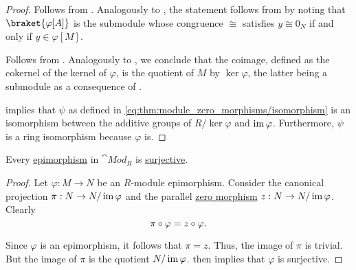 \begin{proof}
   Follows from .
   Analogously to , the statement follows from  by noting that \( \braket{ \varphi[A] } \) is the submodule whose congruence \( \cong \) satisfies \( y \cong 0_N \) if and only if \( y \in \varphi[M] \).

   Follows from .
   Analogously to , we conclude that the coimage, defined as the cokernel of the kernel of \( \varphi \), is the quotient of \( M \) by \( \ker \varphi \), the latter being a submodule as a consequence of .

    implies that \( \psi \) as defined in \eqref{eq:thm:module_zero_morphisms/isomorphism} is an isomorphism between the additive groups of \( R / \ker \varphi \) and \( \operatorname{im} \varphi \). Furthermore, \( \psi \) is a ring isomorphism because \( \varphi \) is.
\end{proof}

\begin{proposition}\label{thm:module_epimorphisms_are_surjective}
  Every \hyperref[def:morphism_invertibility/right_cancellative]{epimorphism} in \hyperref[def:group/category]{\( \cat{Mod}_R \)} is \hyperref[def:function_invertibility/surjective]{surjective}.
\end{proposition}
\begin{proof}
  Let \( \varphi: M \to N \) be an \( R \)-module epimorphism. Consider the canonical projection \( \pi: N \to N / \operatorname{im} \varphi \) and the parallel \hyperref[def:zero_morphisms/morphism]{zero morphism} \( z: N \to N / \operatorname{im} \varphi \). Clearly
  \begin{equation*}
    \pi \bincirc \varphi = z \bincirc \varphi.
  \end{equation*}

  Since \( \varphi \) is an epimorphism, it follows that \( \pi = z \). Thus, the image of \( \pi \) is trivial. But the image of \( \pi \) is the quotient \( N / \operatorname{im} \varphi \).  then implies that \( \varphi \) is surjective.
\end{proof}

